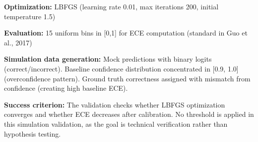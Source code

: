 \textbf{Optimization:} LBFGS (learning rate 0.01, max iterations 200, initial temperature 1.5)

\textbf{Evaluation:} 15 uniform bins in [0,1] for ECE computation (standard in Guo et al., 2017)

\textbf{Simulation data generation:} Mock predictions with binary logits (correct/incorrect). Baseline confidence distribution concentrated in [0.9, 1.0] (overconfidence pattern). Ground truth correctness assigned with mismatch from confidence (creating high baseline ECE).

\textbf{Success criterion:} The validation checks whether LBFGS optimization converges and whether ECE decreases after calibration. No threshold is applied in this simulation validation, as the goal is technical verification rather than hypothesis testing.
